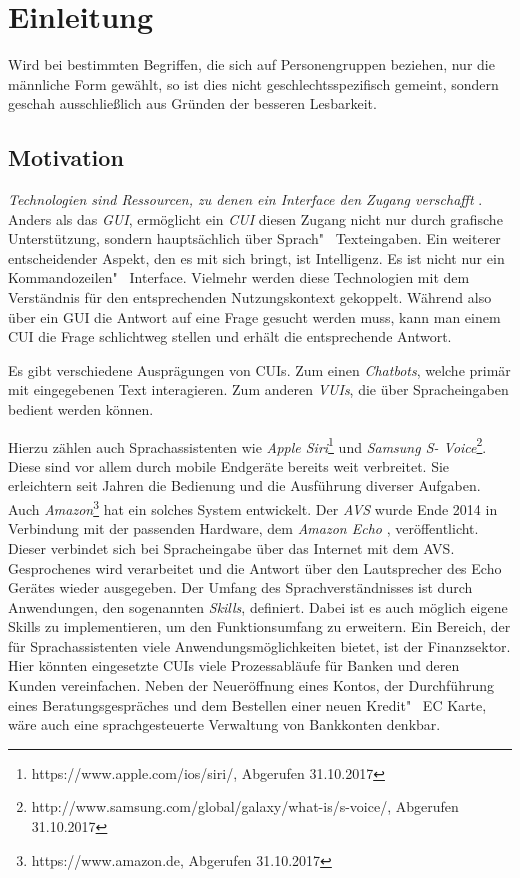 \chapter{Einleitung}
\label{cha:einleitung}

Wird bei bestimmten Begriffen, die sich auf Personengruppen beziehen, nur die männliche Form gewählt, so ist dies nicht geschlechtsspezifisch gemeint, sondern geschah ausschließlich aus Gründen der besseren Lesbarkeit.

\section{Motivation}
\label{sec:motivation}

\textit{Technologien sind Ressourcen, zu denen ein Interface den Zugang verschafft} \cite{cui-future-interface}. Anders als das \textit{\ac{GUI}}, ermöglicht ein \textit{\ac{CUI}} diesen Zugang nicht nur durch grafische Unterstützung, sondern hauptsächlich über Sprach"~ \bzw Texteingaben. Ein weiterer entscheidender Aspekt, den es mit sich bringt, ist Intelligenz. Es ist nicht nur ein Kommandozeilen"~ Interface. Vielmehr werden diese Technologien mit dem Verständnis für den entsprechenden Nutzungskontext gekoppelt. Während also über ein \ac{GUI} die Antwort auf eine Frage gesucht werden muss, kann man einem \ac{CUI} die Frage schlichtweg stellen und erhält die entsprechende Antwort. 

Es gibt verschiedene Ausprägungen von \acp{CUI}. Zum einen \textit{Chatbots}, welche primär mit eingegebenen Text interagieren. Zum anderen \textit{\acp{VUI}}, die über Spracheingaben bedient werden können. 

Hierzu zählen auch Sprachassistenten wie \textit{Apple Siri}\footnote{https://www.apple.com/ios/siri/, Abgerufen 31.10.2017} und \textit{Samsung S- Voice}\footnote{http://www.samsung.com/global/galaxy/what-is/s-voice/, Abgerufen 31.10.2017}. Diese sind vor allem durch mobile Endgeräte bereits weit verbreitet. Sie erleichtern seit Jahren die Bedienung und die Ausführung diverser Aufgaben. Auch \textit{Amazon}\footnote{https://www.amazon.de, Abgerufen 31.10.2017} hat ein solches System entwickelt. Der \textit{\ac{AVS}} \cite{amazon-developer-alexa} wurde Ende 2014 in Verbindung mit der passenden Hardware, dem \textit{Amazon Echo} \cite{amazon-echo}, veröffentlicht. Dieser verbindet sich bei Spracheingabe über das Internet mit dem AVS. Gesprochenes wird verarbeitet und die Antwort über den Lautsprecher des Echo Gerätes wieder ausgegeben. Der Umfang des Sprachverständnisses ist durch Anwendungen, den sogenannten \textit{Skills}, definiert. Dabei ist es auch möglich eigene Skills zu implementieren, um den Funktionsumfang zu erweitern. 
Ein Bereich, der für Sprachassistenten viele Anwendungsmöglichkeiten bietet, ist der Finanzsektor. Hier könnten eingesetzte \acp{CUI} viele Prozessabläufe für Banken und deren Kunden vereinfachen. Neben der Neueröffnung eines Kontos, der Durchführung eines Beratungsgespräches und dem Bestellen einer neuen Kredit"~ \bzw EC Karte, wäre auch eine sprachgesteuerte Verwaltung von Bankkonten denkbar.


